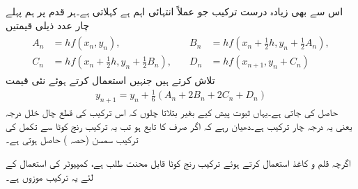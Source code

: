 اس سے بھی زیادہ درست ترکیب جو عملاً انتہائی اہم ہے  کہلاتی ہے۔ہر قدم پر ہم پہلے چار عدد ذیلی قیمتیں
\begin{gather}
\begin{aligned}\label{مساوات_اعدادی_رنج_کوٹا_الف}
A_n&=hf(x_n,y_n),\\
C_n&=hf(x_n+\tfrac{1}{2}h,y_n+\tfrac{1}{2}B_n),
\end{aligned}
\quad 
\begin{aligned}
B_n&=hf(x_n+\tfrac{1}{2}h,y_n+\tfrac{1}{2}A_n),\\
D_n&=hf(x_{n+1},y_n+C_n)
\end{aligned}
\end{gather}
 تلاش کرتے ہیں جنہیں استعمال کرتے ہوئے نئی قیمت
\begin{align}\label{مثال_اعدادی_ترکیب_یولر_ب}
y_{n+1}=y_n+\tfrac{1}{6}(A_n+2B_n+2C_n+D_n)
\end{align}
حاصل کی جاتی ہے۔یہاں ثبوت پیش کیے بغیر بتلاتا چلوں کہ اس ترکیب کی قطع چال خلل درجہ  یعنی یہ درجہ چار ترکیب  ہے۔دھیان رہے کہ اگر  صرف  کا تابع ہو تب یہ ترکیب رنج کوٹا سے تکمل کی ترکیب سمسن (حصہ ) حاصل ہوتی ہے۔

اگرچہ قلم و کاغذ استعمال کرتے ہوئے ترکیب رنج کوٹا قابل محنت طلب ہے، کمپیوٹر کی استعمال کے لئے یہ ترکیب موزوں ہے۔

